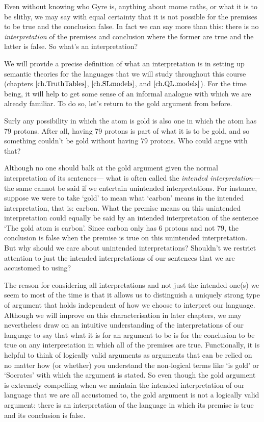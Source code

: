 Even without knowing who Gyre is, anything about mome raths, or what it is to be slithy, we may say with equal certainty that it is not possible for the premises to be true and the conclusion false.
In fact we can say more than this: there is no \textit{interpretation} of the premises and conclusion where the former are true and the latter is false.
So what's an interpretation?

We will provide a precise definition of what an interpretation is in setting up semantic theories for the languages that we will study throughout this course (chapters $\ref{ch.TruthTables}$, $\ref{ch.SLmodels}$, and $\ref{ch.QL.models}$).
For the time being, it will help to get some sense of an informal analogue with which we are already familiar.
To do so, let's return to the gold argument from before.

Surly any possibility in which the atom is gold is also one in which the atom has 79 protons.
After all, having 79 protons is part of what it is to be gold, and so something couldn't be gold without having 79 protons.
Who could argue with that?

Although no one should balk at the gold argument given the normal interpretation of its sentences--- what is often called the \textit{intended interpretation}--- the same cannot be said if we entertain unintended interpretations.
For instance, suppose we were to take `gold' to mean what `carbon' means in the intended interpretation, that is: carbon.
What the premise means on this unintended interpretation could equally be said by an intended interpretation of the sentence `The gold atom is carbon'.
Since carbon only has 6 protons and not 79, the conclusion is false when the premise is true on this unintended interpretation.
But why should we care about unintended interpretations?
Shouldn't we restrict attention to just the intended interpretations of our sentences that we are accustomed to using?

The reason for considering all interpretations and not just the intended one(s) we seem to most of the time is that it allows us to distinguish a uniquely strong type of argument that holds independent of how we choose to interpret our language.
Although we will improve on this characterisation in later chapters, we may nevertheless draw on an intuitive understanding of the interpretations of our language to say that what it is for an argument to be  is for the conclusion to be true on any interpretation in which all of the premises are true. 
Functionally, it is helpful to think of logically valid arguments as arguments that can be relied on no matter how (or whether) you understand the non-logical terms like `is gold' or `Socrates' with which the argument is stated.
So even though the gold argument is extremely compelling when we maintain the intended interpretation of our language that we are all accustomed to, the gold argument is not a logically valid argument: there is an interpretation of the language in which its premise is true and its conclusion is false.

